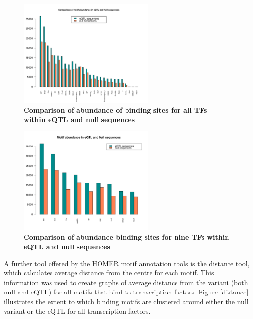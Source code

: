 \documentclass[12pt]{article}
\begin{document}
\begin{figure}[!htbp]
\centering
\includegraphics[width= 0.6\textwidth]{AllMotifComparison.pdf} 
\caption{\bf{Comparison of abundance of binding sites for all TFs within eQTL and null sequences}}
\label{allMotifComparison}
\end{figure}

\begin{figure}[!htbp]
\centering
\includegraphics[width= 0.6\textwidth]{Top9TFsComparison.pdf} 
\caption{\bf{Comparison of abundance binding sites for nine TFs within eQTL and null sequences}}
\label{top9Comparison}
\end{figure}

A further tool offered by the HOMER motif annotation tools is the distance tool, which calculates average distance from the centre for each motif. This information was used to create graphs of average distance from the variant (both null and eQTL) for all motifs that bind to transcription factors. Figure \ref{distance} illustrates the extent to which binding motifs are clustered around either the null variant or the eQTL for all transcription factors.
\end{document}
